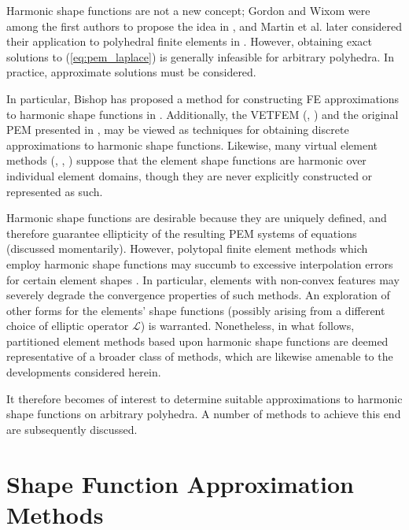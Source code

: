 	Harmonic shape functions are not a new concept; Gordon and Wixom were among the first authors to propose the idea in \cite{Gordon:74}, and Martin et al. later considered their application to polyhedral finite elements in \cite{Martin:08}. However, obtaining exact solutions to (\ref{eq:pem_laplace}) is generally infeasible for arbitrary polyhedra. In practice, approximate solutions must be considered.
	
	In particular, Bishop has proposed a method for constructing FE approximations to harmonic shape functions in \cite{Bishop:14}. Additionally, the VETFEM (\cite{Rashid:00}, \cite{Rashid:06}) and the original PEM presented in \cite{Rashid:12}, may be viewed as techniques for obtaining discrete approximations to harmonic shape functions. Likewise, many virtual element methods (\cite{Chi:17}, \cite{Veiga:13}, \cite{Veiga:15}) suppose that the element shape functions are harmonic over individual element domains, though they are never explicitly constructed or represented as such.

	Harmonic shape functions are desirable because they are uniquely defined, and therefore guarantee ellipticity of the resulting PEM systems of equations (discussed momentarily). However, polytopal finite element methods which employ harmonic shape functions may succumb to excessive interpolation errors for certain element shapes \cite{Gillette:16}. In particular, elements with non-convex features may severely degrade the convergence properties of such methods. An exploration of other forms for the elements' shape functions (possibly arising from a different choice of elliptic operator $\mathcal{L}$) is warranted. Nonetheless, in what follows, partitioned element methods based upon harmonic shape functions are deemed representative of a broader class of methods, which are likewise amenable to the developments considered herein.
	
	It therefore becomes of interest to determine suitable approximations to harmonic shape functions on arbitrary polyhedra. A number of methods to achieve this end are subsequently discussed.
	
\section{Shape Function Approximation Methods} \label{sec:approximations}
	
